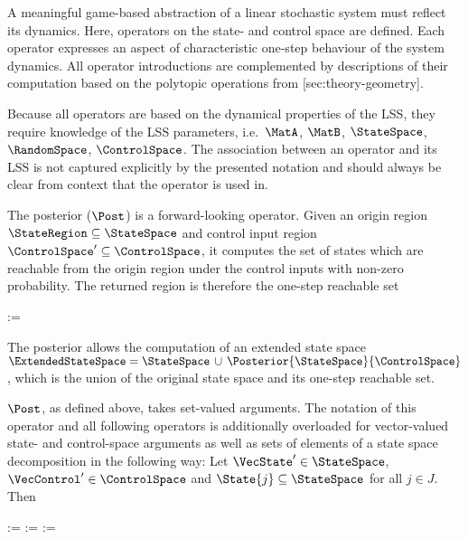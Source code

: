 A meaningful game-based abstraction of a linear stochastic system must reflect its dynamics.
Here, operators on the state- and control space are defined.
Each operator expresses an aspect of characteristic one-step behaviour of the system dynamics.
All operator introductions are complemented by descriptions of their computation based on the polytopic operations from [sec:theory-geometry].

Because all operators are based on the dynamical properties of the LSS, they require knowledge of the LSS parameters, i.e.\ $\MatA$, $\MatB$, $\StateSpace$, $\RandomSpace$, $\ControlSpace$.
The association between an operator and its LSS is not captured explicitly by the presented notation and should always be clear from context that the operator is used in.


\startsubsection[title={Posterior}]

    The posterior ($\Post$) is a forward-looking operator.
    Given an origin region $\StateRegion \subseteq \StateSpace$ and control input region $\ControlSpace' \subseteq \ControlSpace$, it computes the set of states which are reachable from the origin region under the control inputs with non-zero probability.
    The returned region is therefore the one-step reachable set

    \startformula
        \Posterior{\StateRegion}{\ControlRegion} :=  \EndPeriod
    \stopformula

    The posterior allows the computation of an extended state space $\ExtendedStateSpace = \StateSpace \,\cup\, \Posterior{\StateSpace}{\ControlSpace}$, which is the union of the original state space and its one-step reachable set.

    $\Post$, as defined above, takes set-valued arguments.
    The notation of this operator and all following operators is additionally overloaded for vector-valued state- and control-space arguments as well as sets of elements of a state space decomposition in the following way:
    Let $\VecState' \in \StateSpace$, $\VecControl' \in \ControlSpace$ and $\State{j} \subseteq \StateSpace$ for all $j \in J$.
    Then

    \startformula
        \startalign[n=2,align={right,left}]
            \NC {} :=
            \NC {} \EndComma
            \NR
            \NC {} :=
            \NC {} \EndAnd
            \NR
            \NC {} :=
            \NC {} \EndPeriod
            \NR
        \stopalign
    \stopformula

